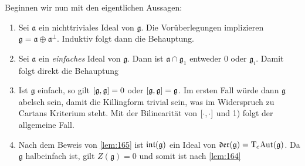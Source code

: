 \begin{beweis}
\begin{enumerate}[i),itemsep=0pt]
	\end{enumerate}
	Beginnen wir nun mit den eigentlichen Aussagen:
	\begin{enumerate}[1),itemsep=0pt]
		\item Sei $\mathfrak{a}$ ein nichttriviales Ideal von $\mathfrak{g}$.
		Die Vorüberlegungen  implizieren $\mathfrak{g} = \mathfrak{a} \oplus \mathfrak{a}^\perp$.
		Induktiv folgt dann die Behauptung.
		\item Sei $\mathfrak{a}$ ein \emph{einfaches} Ideal von $\mathfrak{g}$.
		Dann ist $\mathfrak{a} \cap \mathfrak{g}_1$ entweder $0$ oder $\mathfrak{g}_i$.
		Damit folgt direkt die Behauptung
		\item Ist $\mathfrak{g}$ einfach, so gilt $\benbrace*{\mathfrak{g},\mathfrak{g}}=0$ oder $\benbrace*{\mathfrak{g},\mathfrak{g}}=\mathfrak{g}$.
		Im ersten Fall würde dann $\mathfrak{g}$ abelsch sein, damit die Killingform trivial sein, was im Widerspruch zu Cartans Kriterium steht.
		Mit der Bilinearität von $\benbrace*{\cdot,\cdot}$ und 1) folgt der allgemeine Fall.
		\item Nach dem Beweis von \autoref{lem:165} ist $\intAlg(\mathfrak{g})$ ein Ideal von $\Der(\mathfrak{g}) = \Tmap_e\!\Aut(\mathfrak{g})$.
		Da $\mathfrak{g}$ halbeinfach ist, gilt $Z(\mathfrak{g}) =0$ und somit ist nach \autoref{lem:164}

\end{enumerate}
\end{beweis}
